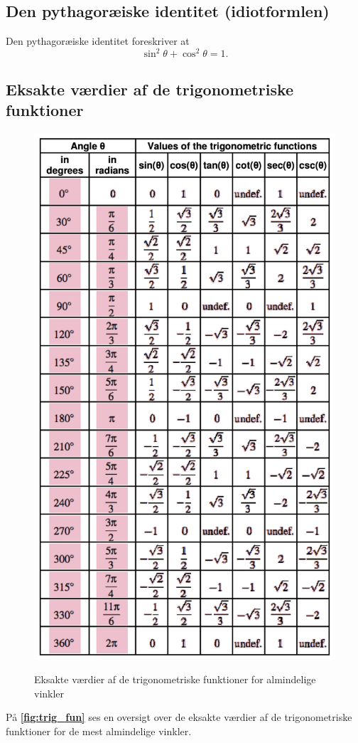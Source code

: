 \subsection{Den pythagoræiske identitet (idiotformlen)}
Den pythagoræiske identitet foreskriver at
\[ 
\sin^2 \theta + \cos^2 \theta = 1
.\]

\subsection{Eksakte værdier af de trigonometriske funktioner}
\begin{figure} [ht]
  \centering
  \caption{Eksakte værdier af de trigonometriske funktioner for almindelige vinkler}
  \includegraphics[width=0.75\linewidth]{../figures/trig_fun.png}
  \label{fig:trig_fun}
\end{figure}

På \textbf{\autoref{fig:trig_fun}} ses en oversigt over de eksakte værdier af de trigonometriske funktioner for de mest almindelige vinkler.

